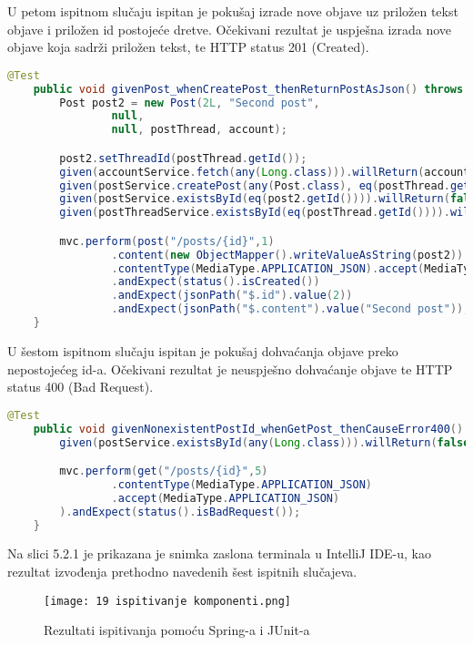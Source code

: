 			U petom ispitnom slučaju ispitan je pokušaj izrade nove objave uz priložen tekst objave i priložen id postojeće dretve. Očekivani rezultat je uspješna izrada nove objave koja sadrži priložen tekst, te HTTP status 201 (Created).

			\begin{lstlisting}[language=Java, breaklines=true]
    @Test
    public void givenPost_whenCreatePost_thenReturnPostAsJson() throws Exception {
        Post post2 = new Post(2L, "Second post",
                null,
                null, postThread, account);

        post2.setThreadId(postThread.getId());
        given(accountService.fetch(any(Long.class))).willReturn(account);
        given(postService.createPost(any(Post.class), eq(postThread.getId()))).willReturn(post2);
        given(postService.existsById(eq(post2.getId()))).willReturn(false);
        given(postThreadService.existsById(eq(postThread.getId()))).willReturn(true);

        mvc.perform(post("/posts/{id}",1)
                .content(new ObjectMapper().writeValueAsString(post2))
                .contentType(MediaType.APPLICATION_JSON).accept(MediaType.APPLICATION_JSON))
                .andExpect(status().isCreated())
                .andExpect(jsonPath("$.id").value(2))
                .andExpect(jsonPath("$.content").value("Second post"));
    }
			\end{lstlisting}

			U šestom ispitnom slučaju ispitan je pokušaj dohvaćanja objave preko nepostojećeg id-a.
			Očekivani rezultat je neuspješno dohvaćanje objave te HTTP status 400 (Bad Request).

			\begin{lstlisting}[language=Java, breaklines=true]
    @Test
    public void givenNonexistentPostId_whenGetPost_thenCauseError400() throws Exception {
        given(postService.existsById(any(Long.class))).willReturn(false);

        mvc.perform(get("/posts/{id}",5)
                .contentType(MediaType.APPLICATION_JSON)
                .accept(MediaType.APPLICATION_JSON)
        ).andExpect(status().isBadRequest());
    }
			\end{lstlisting}

			Na slici 5.2.1 je prikazana je snimka zaslona terminala u IntelliJ IDE-u, kao rezultat izvođenja prethodno navedenih šest ispitnih slučajeva.

			\begin{figure}[H]
					\centering
					\texttt{[image: 19 ispitivanje komponenti.png]}
					\caption{Rezultati ispitivanja pomoću Spring-a i JUnit-a}
				\end{figure}
			\eject

